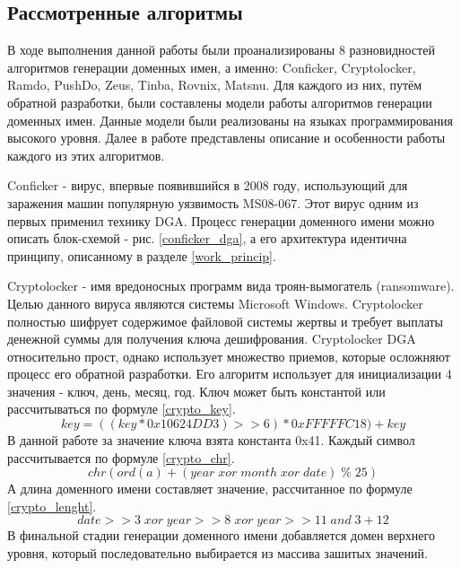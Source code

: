     \subsection{Рассмотренные алгоритмы}\label{dga_teor}
    В ходе выполнения данной работы были проанализированы 8 разновидностей алгоритмов генерации доменных имен, а именно: Conficker, Cryptolocker, Ramdo, PushDo, Zeus, Tinba, Rovnix, Matsnu. Для каждого из них, путём обратной разработки, были составлены модели работы алгоритмов генерации доменных имен. Данные модели были реализованы на языках программирования высокого уровня. Далее в работе представлены описание и особенности работы каждого из этих алгоритмов.

Conficker - вирус, впервые появившийся в 2008 году, использующий для заражения машин популярную уязвимость MS08-067. Этот вирус одним из первых применил технику DGA. Процесс генерации доменного имени можно описать блок-схемой - рис. \ref{conficker_dga}, а его архитектура идентична принципу, описанному в разделе \ref{work_princip}.

Cryptolocker - имя вредоносных программ вида троян-вымогатель (ransomware). Целью данного вируса являются системы Microsoft Windows. Cryptolocker полностью шифрует содержимое файловой системы жертвы и требует выплаты денежной суммы для получения ключа дешифрования. Cryptolocker DGA относительно прост, однако использует множество приемов, которые осложняют процесс его обратной разработки. Его алгоритм использует для инициализации 4 значения - ключ, день, месяц, год.
Ключ может быть константой или рассчитываться по формуле \ref{crypto_key}.
\begin{equation}\label{crypto_key}
key = ((key * 0x10624DD3) >> 6) * 0xFFFFFC18)+ key
\end{equation}
В данной работе за значение ключа взята константа 0x41.
Каждый символ рассчитывается по формуле \ref{crypto_chr}.
\begin{equation}\label{crypto_chr}
chr(ord(a) + (year \; xor \; month\; xor \;date) \;\% \;25)
\end{equation}
А длина доменного имени составляет значение, рассчитанное по формуле \ref{crypto_lenght}.
\begin{equation}\label{crypto_lenght}
date>>3 \; xor \; year>>8 \; xor  \;year>>11 \; and \; 3 + 12
\end{equation}
В финальной стадии генерации доменного имени добавляется домен верхнего уровня, который последовательно выбирается из массива зашитых значений.

